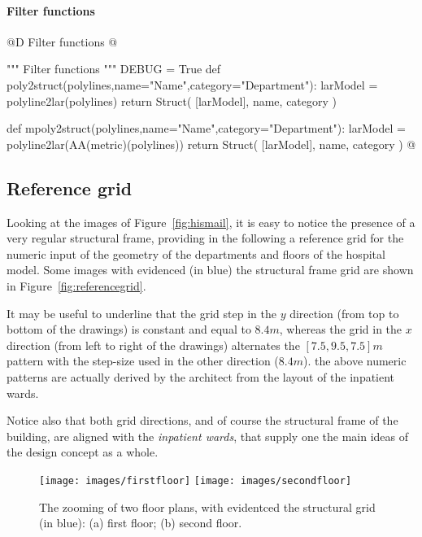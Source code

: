 \documentclass[11pt,oneside]{article}    %
\begin{document}
\paragraph{Filter functions}
@D Filter functions
@{""" Filter functions """
DEBUG = True
def poly2struct(polylines,name="Name",category="Department"):
    larModel = polyline2lar(polylines)
    return Struct( [larModel], name, category )
    
def mpoly2struct(polylines,name="Name",category="Department"):
    larModel = polyline2lar(AA(metric)(polylines))
    return Struct( [larModel], name, category )
@}

\subsection{Reference grid}
\label{sec:grid}

Looking at the images of Figure~\ref{fig:hismail}, it is easy to notice the presence of a very regular structural frame, providing in the following a reference grid for the numeric input of the geometry of the departments and floors of the hospital model. Some images with evidenced (in blue) the structural frame grid are shown in Figure~\ref{fig:referencegrid}.

It may be useful to underline that the grid step in the $y$ direction (from top to bottom of the drawings) is constant and equal to $8.4 m$, whereas the grid in the $x$ direction (from left to right of the drawings) alternates the $[7.5,9.5,7.5] m$ pattern with the step-size used in the other direction ($8.4 m$).  the above numeric patterns are actually derived by the architect from the layout of the inpatient wards.

Notice also that both grid directions, and of course the structural frame of the building, are aligned with the \emph{inpatient wards}, that supply one the main ideas of the design concept as a whole.


\begin{figure}[htbp] %
   \centering
   \texttt{[image: images/firstfloor]} 
   \texttt{[image: images/secondfloor]} 
   \caption{The zooming of two floor plans, with evidentced the structural grid (in blue): (a) first floor; (b) second floor.}
   \label{fig:referencegrid1}
\end{figure}
\end{document}
